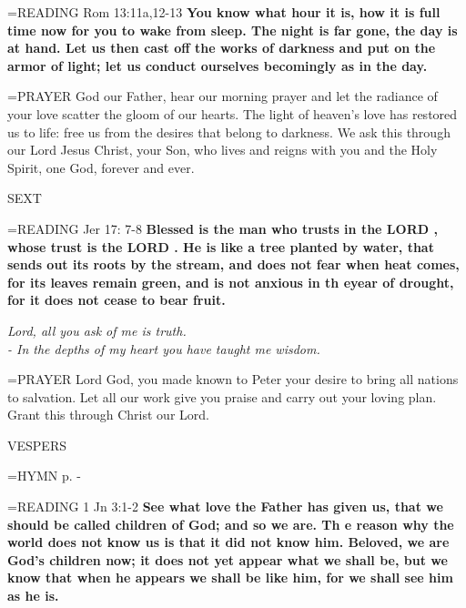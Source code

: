 \hangindent=\parindent \small{READING} Rom 13:11a,12-13 \textbf{You know what hour it is, how it is full time now for you to wake from sleep. The night is far gone, the day is at hand. Let us then cast off the works of darkness and put on the armor of light; let us conduct ourselves becomingly as in the day.\\}

\hangindent=\parindent \small{PRAYER  God our Father, hear our morning prayer and let the radiance of your love scatter the gloom of our hearts. The light of heaven’s love has restored us to life: free us from the desires that belong to darkness.  We ask this through our Lord Jesus Christ, your Son, who lives and reigns with you and the Holy Spirit, one God, forever and ever.}

\begin{flushleft}\normalsize SEXT\\\end{flushleft}

\hangindent=\parindent \small{READING} Jer 17: 7-8 \textbf{Blessed is the man who trusts in the LORD , whose trust is the LORD . He is like a tree planted by water, that sends out its roots by the stream, and does not fear when heat comes, for its leaves remain green, and is not anxious in th eyear of drought, for it does not cease to bear fruit.}

\begin{center}
\textit{Lord, all you ask of me is truth.\\
- In the depths of my heart you have taught me wisdom.}
\end{center}

\hangindent=\parindent \small{PRAYER  Lord God, you made known to Peter your desire to bring all}
nations to salvation. Let all our work give you praise and carry out
your loving plan. Grant this through Christ our Lord.

\begin{flushleft}\normalsize VESPERS\\\end{flushleft}

\hangindent=\parindent \small{\uppercase{HYMN} p.  \pageref{ordinaryTime:fourthHymn} - \pageref{ordinaryTime:sixthHymn} \\}

\hangindent=\parindent \small{READING} 1 Jn 3:1-2 \textbf{See what love the Father has given us, that we should be called children of God; and so we are. Th e reason why the world does not know us is that it did not know him. Beloved, we are God’s children now; it does not yet appear what we shall be, but we know that when he appears we shall be like him, for we shall see him as he is.\\}

